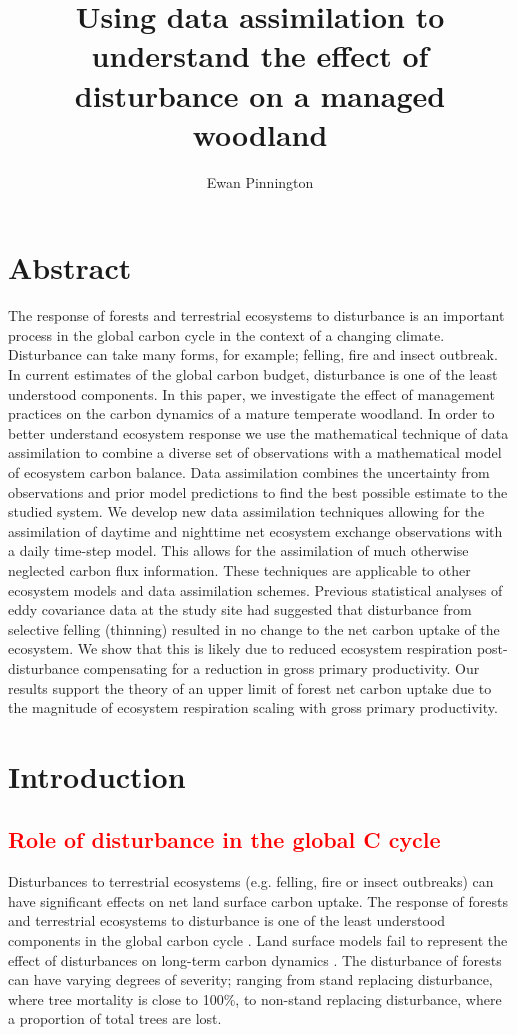 \documentclass[11pt]{article}
\title{Using data assimilation to understand the effect of disturbance on a managed woodland}
\author{Ewan Pinnington}
\begin{document}
\maketitle


\section*{Abstract}
The response of forests and terrestrial ecosystems to disturbance is an important process in the global carbon cycle in the context of a changing climate. Disturbance can take many forms, for example; felling, fire and insect outbreak. In current estimates of the global carbon budget, disturbance is one of the least understood components. In this paper, we investigate the effect of management practices on the carbon dynamics of a mature temperate woodland. In order to better understand ecosystem response we use the mathematical technique of data assimilation to combine a diverse set of observations with a mathematical model of ecosystem carbon balance. Data assimilation combines the uncertainty from observations and prior model predictions to find the best possible estimate to the studied system. We develop new data assimilation techniques allowing for the assimilation of daytime and nighttime net ecosystem exchange observations with a daily time-step model. This allows for the assimilation of much otherwise neglected carbon flux information. These techniques are applicable to other ecosystem models and data assimilation schemes. Previous statistical analyses of eddy covariance data at the study site had suggested that disturbance from selective felling (thinning) resulted in no change to the net carbon uptake of the ecosystem. We show that this is likely due to reduced ecosystem respiration post-disturbance compensating for a reduction in gross primary productivity. Our results support the theory of an upper limit of forest net carbon uptake due to the magnitude of ecosystem respiration scaling with gross primary productivity.  

\section{Introduction}
\subsection{\textcolor{red}{Role of disturbance in the global C cycle}}
Disturbances to terrestrial ecosystems (e.g. felling, fire or insect outbreaks) can have significant effects on net land surface carbon uptake. The response of forests and terrestrial ecosystems to disturbance is one of the least understood components in the global carbon cycle \citep{ciais2014carbon}. Land surface models fail to represent the effect of disturbances on long-term carbon dynamics \citep{running2008ecosystem}. The disturbance of forests can have varying degrees of severity; ranging from stand replacing disturbance, where tree mortality is close to 100\%, to non-stand replacing disturbance, where a proportion of total trees are lost.
\end{document}
